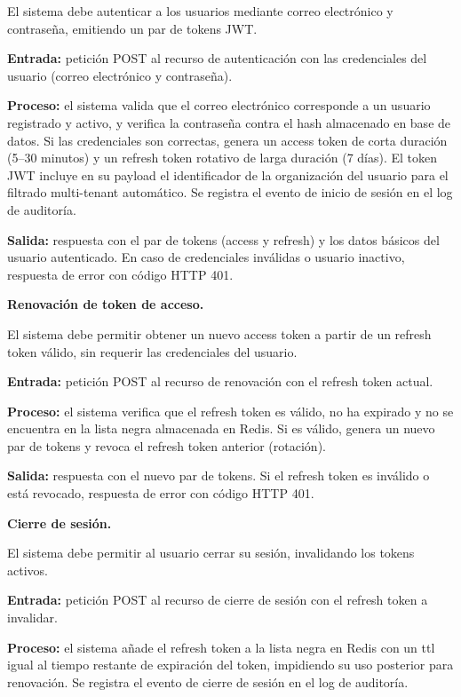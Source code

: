\begin{functional}
\begin{functional}
    El sistema debe autenticar a los usuarios mediante correo electrónico y contraseña, emitiendo un par de tokens JWT.

    \textbf{Entrada:} petición POST al recurso de autenticación con las credenciales del usuario (correo electrónico y contraseña).

    \textbf{Proceso:} el sistema valida que el correo electrónico corresponde a un usuario registrado y activo, y verifica la contraseña contra el hash almacenado en base de datos. Si las credenciales son correctas, genera un access token de corta duración (5–30 minutos) y un refresh token rotativo de larga duración (7 días). El token JWT incluye en su payload el identificador de la organización del usuario para el filtrado multi-tenant automático. Se registra el evento de inicio de sesión en el log de auditoría.

    \textbf{Salida:} respuesta con el par de tokens (access y refresh) y los datos básicos del usuario autenticado. En caso de credenciales inválidas o usuario inactivo, respuesta de error con código HTTP 401.

    \item \textbf{Renovación de token de acceso.}

    El sistema debe permitir obtener un nuevo access token a partir de un refresh token válido, sin requerir las credenciales del usuario.

    \textbf{Entrada:} petición POST al recurso de renovación con el refresh token actual.

    \textbf{Proceso:} el sistema verifica que el refresh token es válido, no ha expirado y no se encuentra en la lista negra almacenada en Redis. Si es válido, genera un nuevo par de tokens y revoca el refresh token anterior (rotación).

    \textbf{Salida:} respuesta con el nuevo par de tokens. Si el refresh token es inválido o está revocado, respuesta de error con código HTTP 401.

    \item \textbf{Cierre de sesión.}

    El sistema debe permitir al usuario cerrar su sesión, invalidando los tokens activos.

    \textbf{Entrada:} petición POST al recurso de cierre de sesión con el refresh token a invalidar.

    \textbf{Proceso:} el sistema añade el refresh token a la lista negra en Redis con un ttl igual al tiempo restante de expiración del token, impidiendo su uso posterior para renovación. Se registra el evento de cierre de sesión en el log de auditoría.


\end{functional}
\end{functional}

